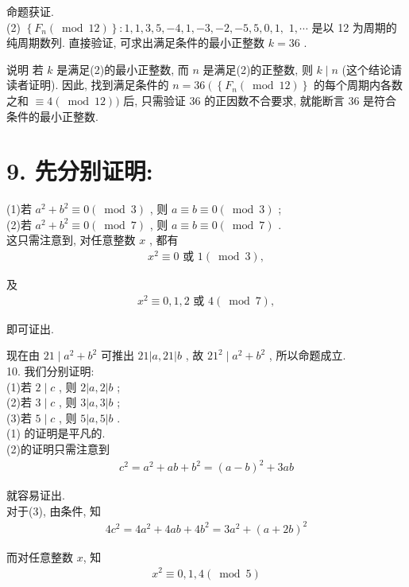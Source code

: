 命题获证.\\
(2) $\left\{F_{n}(\bmod 12)\right\}: 1 ,  1 ,  3 ,  5 , -4 ,  1 , -3 , -2 , -5 ,  5 ,  0 ,  1 , $ $1 ,  \cdots$ 是以 12 为周期的纯周期数列. 直接验证, 可求出满足条件的最小正整数 $k=36$ .

说明 若 $k$ 是满足(2)的最小正整数, 而 $n$ 是满足(2)的正整数, 则 $k \mid n$ (这个结论请读者证明). 因此, 找到满足条件的 $n=36\left(\left\{F_{n}(\bmod 12)\right\}\right.$ 的每个周期内各数之和 $\equiv 4(\bmod 12))$ 后, 只需验证 36 的正因数不合要求, 就能断言 36 是符合条件的最小正整数.

\section{9. 先分别证明:}
 (1)若 $a^{2}+b^{2} \equiv 0(\bmod 3)$ , 则 $a \equiv b \equiv 0(\bmod 3)$ ; \\
(2)若 $a^{2}+b^{2} \equiv 0(\bmod 7)$ , 则 $a \equiv b \equiv 0(\bmod 7)$ . \\
这只需注意到, 对任意整数 $x$ , 都有
\begin{align*}
	x^{2} \equiv 0 \text { 或 } 1(\bmod 3),
\end{align*}

及
\begin{align*}
	x^{2} \equiv 0,1,2 \text { 或 } 4(\bmod 7),
\end{align*}

即可证出.

现在由 $21 \mid a^{2}+b^{2}$ 可推出 $21|a, 21| b$ , 故 $21^{2} \mid a^{2}+b^{2}$ , 所以命题成立.\\
10. 我们分别证明:\\
(1)若 $2 \mid c$ , 则 $2|a, 2| b$ ; \\
(2)若 $3 \mid c$ , 则 $3|a, 3| b$ ; \\
(3)若 $5 \mid c$ , 则 $5|a, 5| b$ . \\
(1) 的证明是平凡的. \\
(2)的证明只需注意到
\begin{align*}
	c^{2}=a^{2}+a b+b^{2}=(a-b)^{2}+3 a b
\end{align*}

就容易证出. \\
对于(3), 由条件, 知
\begin{align*}
	4 c^{2}=4 a^{2}+4 a b+4 b^{2}=3 a^{2}+(a+2 b)^{2}
\end{align*}

而对任意整数 $x$, 知
\begin{align*}
	x^{2} \equiv 0,1,4(\bmod 5)
\end{align*}

